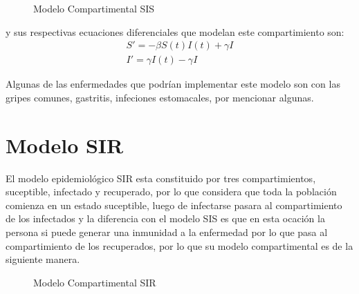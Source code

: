 \documentclass[a4paper,openany,12pt]{book}
\begin{document}
\begin{figure}[h]
\centering
{}
\caption{Modelo Compartimental SIS} \label{fig:Compartimento SIS}
\end{figure}	

y sus respectivas ecuaciones diferenciales que modelan este compartimiento son: 
\begin{align} 
S' =  -\beta S\left(t\right)I\left(t\right) + \gamma I \\
I'   = \gamma I\left(t\right) - \gamma I
\end{align}

Algunas de las enfermedades que podrían implementar este modelo son con las gripes comunes, gastritis, infeciones estomacales, por mencionar algunas. \cite{Martcheva}

\section{Modelo SIR}

El modelo epidemiológico SIR  esta constituido por tres compartimientos, suceptible, infectado y recuperado, por lo que considera que toda la población comienza en un estado suceptible, luego de infectarse pasara al compartimiento de los infectados y la diferencia con el modelo SIS es que en esta ocación la persona si puede generar una inmunidad a la enfermedad por lo que pasa al compartimiento de los recuperados, por lo que su modelo compartimental es de la siguiente manera.\\

\begin{figure}[h]
\centering
{}
\caption{Modelo Compartimental SIR} \label{fig:Compartimento SIR}
\end{figure}	
\end{document}
